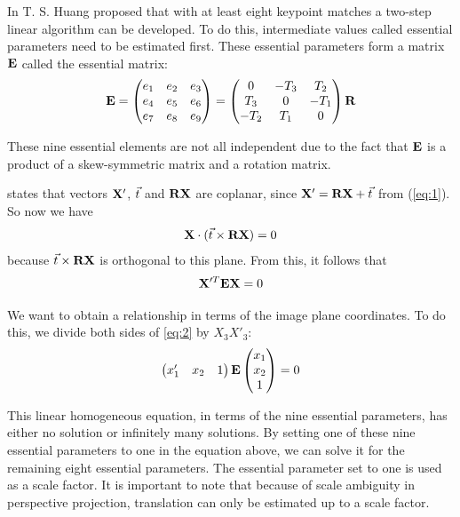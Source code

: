 In \cite{improc} T. S. Huang proposed that with at least eight keypoint matches a two-step linear algorithm can be developed. To do this, intermediate values called essential parameters need to be estimated first. These essential parameters form a matrix $\mathbf{E}$ called the essential matrix:
\begin{equation}
    \mathbf{E} = 
    \begin{pmatrix}
        e_1&e_2&e_3 \\
        e_4&e_5&e_6 \\
        e_7&e_8&e_9 
    \end{pmatrix}
    = \begin{pmatrix}
        0&-T_3&T_2 \\
        T_3&0&-T_1 \\
        -T_2&T_1&0
    \end{pmatrix}
     \mathbf{R}
\end{equation}

These nine essential elements are not all independent due to the fact that  $\mathbf{E}$ is a product of a skew-symmetric matrix and a rotation matrix.\bigskip

\cite{tekalp} states that vectors $\mathbf{X}'$, $\vec t$ and $\mathbf{R}\mathbf{X}$ are coplanar, since $\mathbf{X}' = \mathbf{R}\mathbf{X} + \vec t$ from (\ref{eq:1}). So now we have 
\begin{equation}
    \mathbf{X} \cdot (\vec t \times \mathbf{R}\mathbf{X}) = 0
\end{equation}
because $\vec t \times \mathbf{R}\mathbf{X}$ is orthogonal to this plane. From this, it follows that 
\begin{equation} \label{eq:2}
    \mathbf{X}'^T\mathbf{E}\mathbf{X} = 0
\end{equation}

We want to obtain a relationship in terms of the image plane coordinates. To do this, we divide both sides of \ref{eq:2} by $X_3 X'_3$:
\begin{equation} \label{eq:essential}
    \begin{pmatrix}
        x_1'&x_2&1
    \end{pmatrix}
    \mathbf{E}
    \begin{pmatrix}
        x_1 \\
        x_2 \\
        1
    \end{pmatrix}
    = 0
\end{equation}

This linear homogeneous equation, in terms of the nine essential parameters, has either no solution or infinitely many solutions. By setting one of these nine essential parameters to one in the equation above, we can solve it for the remaining eight essential parameters. The essential parameter set to one is used as a scale factor. It is important to note that because of scale ambiguity in perspective projection, translation can only be estimated up to a scale factor.

